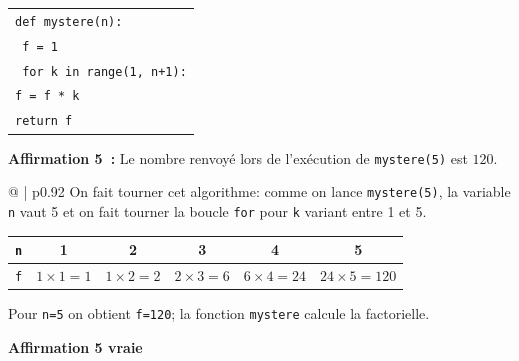 \documentclass[10pt]{article}
\begin{document}
\begin{enumerate}
\begin{center}
\begin{tabular}{|l|}\hline
\texttt{def mystere(n):}\\
\quad \texttt{ f = 1}\\
\quad \texttt{ for k in range(1, n+1):}\\
\quad \quad \texttt{f = f * k}\\
\quad  \texttt{return f}\\ \hline
\end{tabular}

\end{center}

\textbf{Affirmation 5~:} Le nombre renvoyé lors de l'exécution de \texttt{mystere(5)} est $120$.


\medskip

\begin{tabular}{@{\hspace{0.05\linewidth}} | p{0.92\linewidth}}
On fait tourner cet algorithme: comme on lance \texttt{mystere(5)}, la variable \texttt{n} vaut 5 et on fait tourner la boucle \texttt{for} pour \texttt{k} variant entre 1 et 5.

\begin{center}
\begin{tabular}{| *6{c |} }
\hline
\texttt{n} & 1&2&3&4&5\\
\hline
\texttt{f} & $1\times 1=1$ & $1\times 2=2$ & $2\times 3=6$ & $6 \times 4=24$ & $24\times 5=120$\\
\hline
\end{tabular}
\end{center}

Pour \texttt{n=5} on obtient \texttt{f=120}; la fonction \texttt{mystere} calcule la factorielle.

\hfill \textbf{Affirmation 5 vraie} 
\end{tabular}

\end{enumerate}
\end{document}
